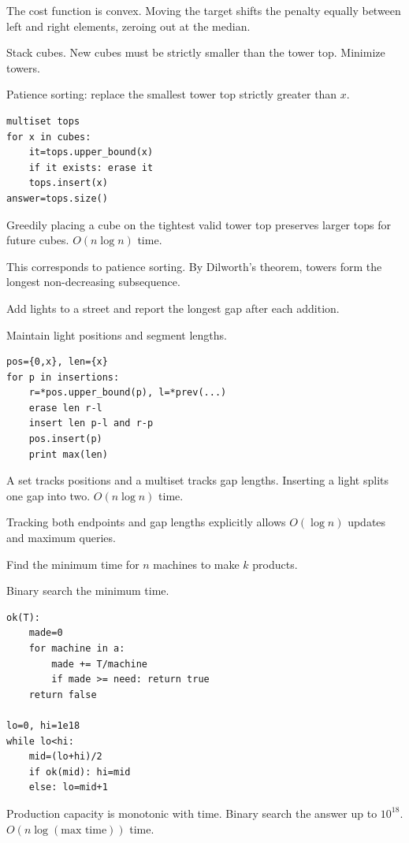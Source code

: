 \Analysis The cost function is convex. Moving the target shifts the penalty equally between left and right elements, zeroing out at the median.


\Problem Stack cubes. New cubes must be strictly smaller than the tower top. Minimize towers.

Patience sorting: replace the smallest tower top strictly greater than $x$.
\begin{lstlisting}
multiset tops
for x in cubes:
    it=tops.upper_bound(x)
    if it exists: erase it
    tops.insert(x)
answer=tops.size()
\end{lstlisting}

\Solution Greedily placing a cube on the tightest valid tower top preserves larger tops for future cubes. $O(n \log n)$ time.

\Analysis This corresponds to patience sorting. By Dilworth's theorem, towers form the longest non-decreasing subsequence.


\Problem Add lights to a street and report the longest gap after each addition.

Maintain light positions and segment lengths.
\begin{lstlisting}
pos={0,x}, len={x}
for p in insertions:
    r=*pos.upper_bound(p), l=*prev(...)
    erase len r-l
    insert len p-l and r-p
    pos.insert(p)
    print max(len)
\end{lstlisting}

\Solution A set tracks positions and a multiset tracks gap lengths. Inserting a light splits one gap into two. $O(n \log n)$ time.

\Analysis Tracking both endpoints and gap lengths explicitly allows $O(\log n)$ updates and maximum queries.


\Problem Find the minimum time for $n$ machines to make $k$ products.

Binary search the minimum time.
\begin{lstlisting}
ok(T):
    made=0
    for machine in a:
        made += T/machine
        if made >= need: return true
    return false

lo=0, hi=1e18
while lo<hi:
    mid=(lo+hi)/2
    if ok(mid): hi=mid
    else: lo=mid+1
\end{lstlisting}

\Solution Production capacity is monotonic with time. Binary search the answer up to $10^{18}$. $O(n \log (\text{max time}))$ time.

